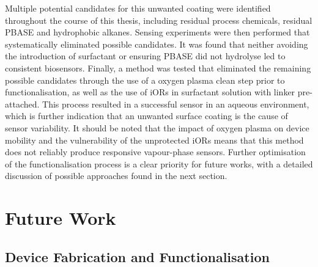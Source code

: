 \documentclass[
  a4paper,
]{scrbook}
\begin{document}
Multiple potential candidates for this unwanted coating were identified
throughout the course of this thesis, including residual process
chemicals, residual PBASE and hydrophobic alkanes. Sensing experiments
were then performed that systematically eliminated possible candidates.
It was found that neither avoiding the introduction of surfactant or
ensuring PBASE did not hydrolyse led to consistent biosensors. Finally,
a method was tested that eliminated the remaining possible candidates
through the use of a oxygen plasma clean step prior to
functionalisation, as well as the use of iORs in surfactant solution
with linker pre-attached. This process resulted in a successful sensor
in an aqueous environment, which is further indication that an unwanted
surface coating is the cause of sensor variability. It should be noted
that the impact of oxygen plasma on device mobility and the
vulnerability of the unprotected iORs means that this method does not
reliably produce responsive vapour-phase sensors. Further optimisation
of the functionalisation process is a clear priority for future works,
with a detailed discussion of possible approaches found in the next
section.

\hypertarget{sec-future-work}{%
\section{Future Work}\label{sec-future-work}}

\hypertarget{sec-future-work-fabrication}{%
\subsection{Device Fabrication and
Functionalisation}\label{sec-future-work-fabrication}}
\end{document}
